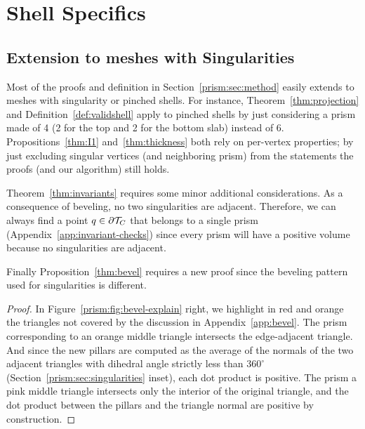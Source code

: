 \chapter{Shell Specifics}

\section{Extension to meshes with Singularities}\label{app:singularity}
Most of the proofs and definition in Section~\ref{prism:sec:method} easily extends to meshes with singularity or pinched shells. For instance,
 Theorem~\ref{thm:projection} and Definition~\ref{def:validshell} apply to pinched shells by just considering a prism made of 4 (2 for the top and 2 for the bottom slab) instead of 6. Propositions~\ref{thm:I1} and~\ref{thm:thickness} both rely on per-vertex properties; by just excluding singular vertices (and neighboring prism) from the statements the proofs (and our algorithm) still holds.


Theorem~\ref{thm:invariants} requires some minor additional considerations. As a consequence of beveling, no two singularities are adjacent. Therefore, we can always find a point $q \in \partial \mathcal{T}_C$ that belongs to a single prism (Appendix~\ref{app:invariant-checks}) since every prism will have a positive volume
because no singularities are adjacent.


Finally Proposition~\ref{thm:bevel} requires a new proof since the beveling pattern used for singularities is different.
\begin{proof}
In  Figure~\ref{prism:fig:bevel-explain} right, we highlight in red and orange the triangles not covered by the discussion in Appendix~\ref{app:bevel}. 
The prism corresponding to an orange middle triangle intersects the edge-adjacent triangle. And since the new pillars are computed as the average of the normals of the two adjacent triangles with dihedral angle strictly less than $360^\circ$ 
 (Section~\ref{prism:sec:singularities} inset), each dot product is positive. 
The prism  a pink middle triangle intersects only the interior of the original triangle, and the dot product between the pillars and the triangle normal are positive by construction. 
\end{proof}



